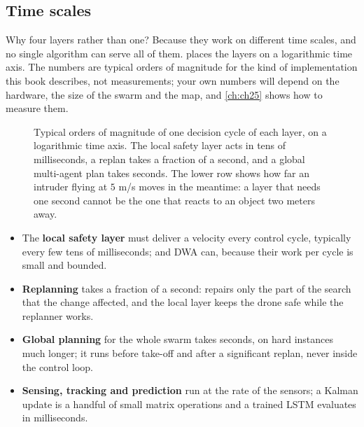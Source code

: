 \subsection{Time scales}
\label{sec:ch01-timescales}

Why four layers rather than one? Because they work on different time scales, and no
single algorithm can serve all of them.  places the layers
on a logarithmic time axis. The numbers are typical orders of magnitude for the kind
of implementation this book describes, not measurements; your own numbers will depend
on the hardware, the size of the swarm and the map, and \cref{ch:ch25} shows how to
measure them.

\begin{figure}[tb]
  \centering
  \caption{Typical orders of magnitude of one decision cycle of each layer, on a
    logarithmic time axis. The local safety layer acts in tens of milliseconds, a replan
    takes a fraction of a second, and a global multi-agent plan takes seconds. The
    lower row shows how far an intruder flying at $5$ m/s moves in the meantime: a
    layer that needs one second cannot be the one that reacts to an object two meters
    away.}
  \label{fig:ch01-timescales}
\end{figure}

\begin{itemize}
  \item The \textbf{local safety layer} must deliver a velocity
        every control cycle, typically every few tens of milliseconds; \orca and DWA
        can, because their work per cycle is small and bounded.
  \item \textbf{Replanning} takes a fraction of a second:
        \dstarlite repairs only the part of the search that the change affected, and
        the local layer keeps the drone safe while the replanner works.
  \item \textbf{Global planning} for the whole swarm takes
        seconds, on hard instances much longer; it runs before take-off and after a
        significant replan, never inside the control loop.
  \item \textbf{Sensing, tracking and prediction} run at the rate of the sensors; a
        Kalman update is a handful of small matrix operations and a trained LSTM
        evaluates in milliseconds.
\end{itemize}

